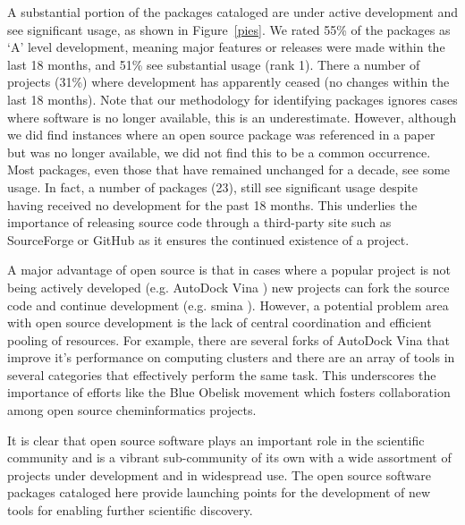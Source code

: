 A substantial portion of the packages cataloged are under active development and see significant usage, as shown in Figure~\ref{pies}.  We rated 55\% of the packages as `A' level development, meaning major features or releases were made within the last 18 months, and 51\% see substantial usage (rank 1).  
There a number of projects (31\%) where development has apparently ceased (no changes within the last 18 months). Note that our methodology for identifying packages 
ignores cases where software is no longer available, this is an underestimate.
 However, although we did find instances where an open source package was referenced in a paper but was no longer available, we did not find this to be a common occurrence.  Most packages, even those that have remained unchanged for a decade, see some usage.  In fact, a number of packages (23), still see significant usage despite having received no development for the past 18 months.  This underlies the importance of releasing source code through a third-party site such as SourceForge or GitHub as it ensures the continued existence of a project.  
 
 A major advantage of open source is that in cases where a popular project is not being actively developed (e.g. AutoDock Vina \cite{Trott_2009}) new projects can fork the source code and continue development (e.g. smina \cite{Koes_2013}).  However, a potential problem area with open source development is the lack of central coordination and efficient pooling of resources.  For example, there are several forks of AutoDock Vina that improve it's performance on computing clusters and there are an array of tools in several categories that effectively perform the same task.  This underscores the importance of efforts like the Blue Obelisk movement \cite{Guha_2006,blueobelisk} which fosters collaboration among open source cheminformatics projects.

It is clear that open source software plays an important role in the scientific community and is a vibrant sub-community of its own with a wide assortment of projects under development and in widespread use.  The open source software packages cataloged here provide launching points for the development of new tools for enabling further scientific discovery.
